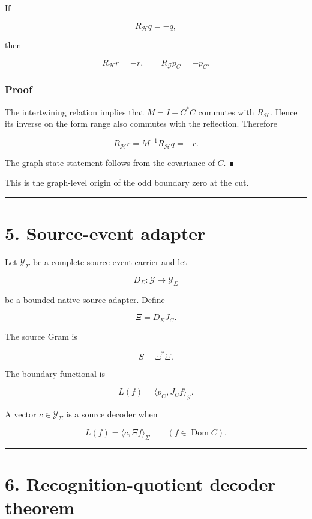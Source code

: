 If

\[
R_{\mathcal H}q=-q,
\]

then

\[
R_{\mathcal H}r=-r,
\qquad
R_{\mathcal G}p_C=-p_C.
\]

\hypertarget{proof-1}{%
\subsubsection{Proof}\label{proof-1}}

The intertwining relation implies that \(M=I+C^*C\) commutes with
\(R_{\mathcal H}\). Hence its inverse on the form range also commutes with the
reflection. Therefore

\[
R_{\mathcal H}r
=M^{-1}R_{\mathcal H}q
=-r.
\]

The graph-state statement follows from the covariance of \(C\). ∎

This is the graph-level origin of the odd boundary zero at the cut.

\begin{center}\rule{0.5\linewidth}{0.5pt}\end{center}

\hypertarget{source-event-adapter}{%
\section{5. Source-event adapter}\label{source-event-adapter}}

Let \(\mathcal Y_\Sigma\) be a complete source-event carrier and let

\[
D_\Sigma:\mathcal G\to\mathcal Y_\Sigma
\]

be a bounded native source adapter. Define

\[
\boxed{
\Xi=D_\Sigma J_C.
}
\]

The source Gram is

\[
S=\Xi^*\Xi.
\]

The boundary functional is

\[
L(f)=\langle p_C,J_Cf\rangle_{\mathcal G}.
\]

A vector \(c\in\mathcal Y_\Sigma\) is a source decoder when

\[
L(f)=\langle c,\Xi f\rangle_\Sigma
\qquad(f\in\operatorname{Dom}C).
\]

\begin{center}\rule{0.5\linewidth}{0.5pt}\end{center}

\hypertarget{recognition-quotient-decoder-theorem}{%
\section{6. Recognition-quotient decoder theorem}\label{recognition-quotient-decoder-theorem}}

